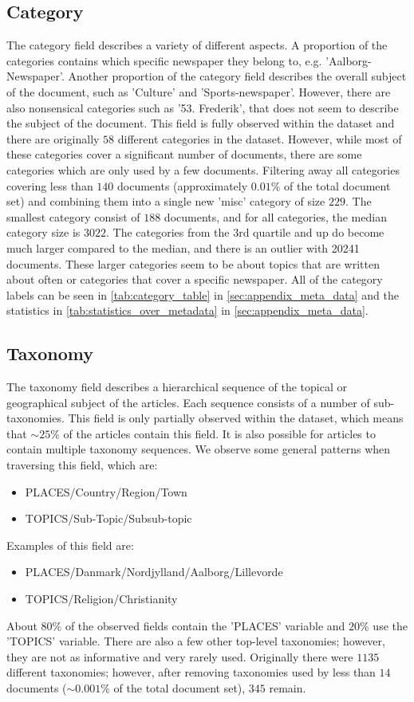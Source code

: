 \subsection{Category}
The category field describes a variety of different aspects.
A proportion of the categories contains which specific newspaper they belong to, e.g. 'Aalborg-Newspaper'.
Another proportion of the category field describes the overall subject of the document, such as 'Culture' and 'Sports-newspaper'.
However, there are also nonsensical categories such as '53. Frederik', that does not seem to describe the subject of the document.
This field is fully observed within the dataset and there are originally $58$ different categories in the dataset.
However, while most of these categories cover a significant number of documents, there are some categories which are only used by a few documents.
Filtering away all categories covering less than $140$ documents (approximately $0.01\%$ of the total document set) and combining them into a single new 'misc' category of size $229$.
The smallest category consist of $188$ documents, and for all categories, the median category size is $3022$.
The categories from the 3rd quartile and up do become much larger compared to the median, and there is an outlier with 20241 documents.
These larger categories seem to be about topics that are written about often or categories that cover a specific newspaper.
All of the category labels can be seen in \autoref{tab:category_table} in \autoref{sec:appendix_meta_data} and the statistics in \autoref{tab:statistics_over_metadata} in \autoref{sec:appendix_meta_data}.

\subsection{Taxonomy}\label{sec:dataset_taxonomy}
The taxonomy field describes a hierarchical sequence of the topical or geographical subject of the articles.
Each sequence consists of a number of sub-taxonomies.
This field is only partially observed within the dataset, which means that ${\sim}25\%$ of the articles contain this field.
It is also possible for articles to contain multiple taxonomy sequences.
We observe some general patterns when traversing this field, which are:
\begin{itemize}
	\item PLACES/Country/Region/Town
	\item TOPICS/Sub-Topic/Subsub-topic
\end{itemize}
Examples of this field are:
\begin{itemize}
	\item PLACES/Danmark/Nordjylland/Aalborg/Lillevorde
	\item TOPICS/Religion/Christianity
\end{itemize}
About $80\%$ of the observed fields contain the 'PLACES' variable and $20\%$ use the 'TOPICS' variable.
There are also a few other top-level taxonomies; however, they are not as informative and very rarely used.
Originally there were $1135$ different taxonomies; however, after removing taxonomies used by less than $14$ documents (${\sim}0.001\%$ of the total document set), $345$ remain.

